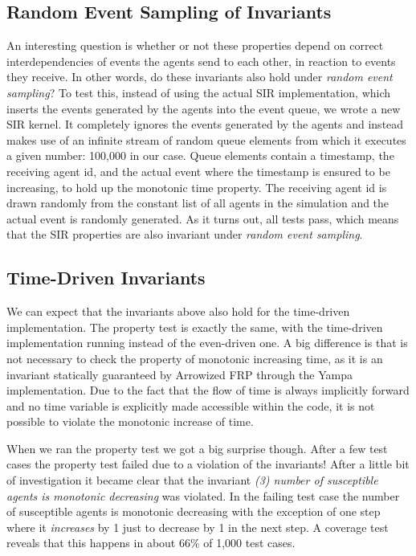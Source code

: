 \subsection{Random Event Sampling of Invariants}
An interesting question is whether or not these properties depend on correct interdependencies of events the agents send to each other, in reaction to events they receive. In other words, do these invariants also hold under \textit{random event sampling}? To test this, instead of using the actual SIR implementation, which inserts the events generated by the agents into the event queue, we wrote a new SIR kernel. It completely ignores the events generated by the agents and instead makes use of an infinite stream of random queue elements from which it executes a given number: 100,000 in our case. Queue elements contain a timestamp, the receiving agent id, and the actual event where the timestamp is ensured to be increasing, to hold up the monotonic time property. The receiving agent id is drawn randomly from the constant list of all agents in the simulation and the actual event is randomly generated. As it turns out, all tests pass, which means that the SIR properties are also invariant under \textit{random event sampling}.

\subsection{Time-Driven Invariants}
We can expect that the invariants above also hold for the time-driven implementation. The property test is exactly the same, with the time-driven implementation running instead of the even-driven one. A big difference is that is not necessary to check the property of monotonic increasing time, as it is an invariant statically guaranteed by Arrowized FRP through the Yampa implementation. Due to the fact that the flow of time is always implicitly forward and no time variable is explicitly made accessible within the code, it is not possible to violate the monotonic increase of time.

When we ran the property test we got a big surprise though. After a few test cases the property test failed due to a violation of the invariants! After a little bit of investigation it became clear that the invariant \textit{(3) number of susceptible agents is monotonic decreasing} was violated. In the failing test case the number of susceptible agents is monotonic decreasing with the exception of one step where it \textit{increases} by 1 just to decrease by 1 in the next step. A coverage test reveals that this happens in about 66\% of 1,000 test cases.

